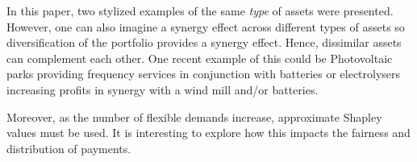 \documentclass[conference]{IEEEtran}
\begin{document}
In this paper, two stylized examples of the same \textit{type} of assets were presented. However, one can also imagine a synergy effect across different types of assets so diversification of the portfolio provides a synergy effect. Hence, dissimilar assets can complement each other. One recent example of this could be Photovoltaic parks providing frequency services in conjunction with batteries or electrolysers increasing profits in synergy with a wind mill and/or batteries.

Moreover, as the number of flexible demands increase, approximate Shapley values must be used. It is interesting to explore how this impacts the fairness and distribution of payments.


% 



\vfill
\end{document}
